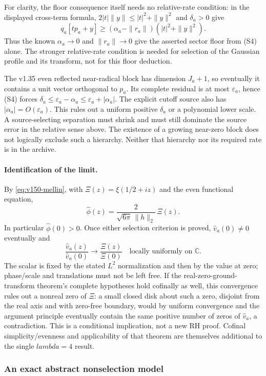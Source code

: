 \documentclass[11pt]{article}
\def\lambda{lambda}%
\theoremstyle{remark}
\begin{document}
For clarity, the floor consequence itself needs no relative-rate
condition: in the displayed cross-term formula,
$2|t|\|y\|\le |t|^2+\|y\|^2$ and $\delta_a>0$ give
\[
 q_a[tp_a+y]\ge(\alpha_a-\|r_a\|)(|t|^2+\|y\|^2).
\]
Thus the known $\alpha_a\to0$ and $\|r_a\|\to0$ give the asserted
sector floor from (S4) alone. The stronger relative-rate condition
is needed for selection of the Gaussian profile and its transform,
not for this floor deduction.

The v1.35 even reflected near-radical block has dimension $J_a+1$,
so eventually it contains a unit vector orthogonal to $p_a$. Its complete
residual is at most $\varepsilon_a$, hence (S4) forces
$\delta_a\le\varepsilon_a-\alpha_a\le\varepsilon_a+|\alpha_a|$.
The explicit cutoff source also has $|\alpha_a|=O(\varepsilon_a)$.
This rules out a uniform positive $\delta_a$ or a polynomial lower scale.
A source-selecting separation must shrink and must still dominate the
source error in the relative sense above. The existence of a growing
near-zero block does not logically exclude such a hierarchy. Neither
that hierarchy nor its required rate is in the archive.

\paragraph{Identification of the limit.}
By \eqref{eq:v150-mellin}, with
$\Xi(z)=\xi(1/2+iz)$ and the even functional equation,
\[
 \widehat\phi(z)=\frac{2}{\sqrt{6\pi}\,\|h\|_2}\,\Xi(z).
\]
In particular $\widehat\phi(0)>0$. Once either selection criterion is
proved, $\widehat v_a(0)\ne0$ eventually and
\[
 \frac{\widehat v_a(z)}{\widehat v_a(0)}
 \longrightarrow\frac{\Xi(z)}{\Xi(0)}
 \quad\text{locally uniformly on }\mathbb C.
\]
The scalar is fixed by the stated $L^2$ normalization and then by the
value at zero; phase/scale and translations must not be left free.
If the real-zero-ground-transform theorem's complete hypotheses hold
cofinally as well, this convergence rules out a nonreal zero of $\Xi$:
a small closed disk about such a zero, disjoint from the real axis and
with zero-free boundary, would by uniform convergence and the argument
principle eventually contain the same positive number of zeros of
$\widehat v_a$, a contradiction. This is a conditional implication,
not a new RH proof. Cofinal simplicity/evenness and applicability of
that theorem are themselves additional to the single $\lambda=4$ result.

\subsubsection*{An exact abstract nonselection model}
\end{document}

